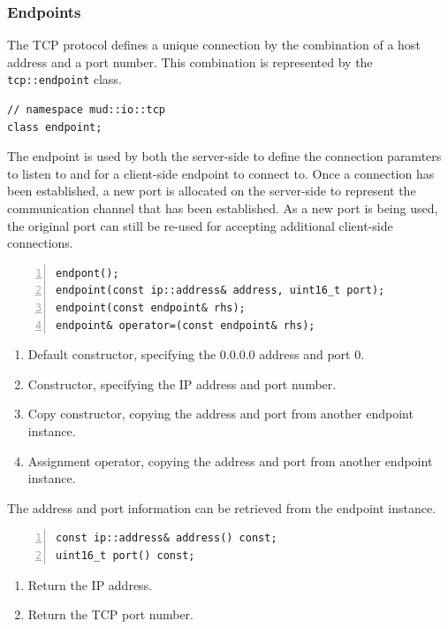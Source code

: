 \documentclass[10pt,a4paper,openany]{mudbook}
\makeatletter
\newcommand{\indextt}[2][]{\texttt{#2}\index{#2@\texttt{#2}#1}}
\newenvironment{enumeratedef}
  {\begin{enumerate}[topsep=0.5em,itemsep=0em,parsep=0em,font=\small]
     \small}
  {\end{enumerate}}
\makeatother
\begin{document}
\subsubsection{Endpoints}

The TCP protocol defines a unique connection by the combination of a host
address and a port number. This combination is represented by the
\indextt{tcp::endpoint} class.

\begin{lstlisting}[style=definition]
// namespace mud::io::tcp
class endpoint;
\end{lstlisting}

The endpoint is used by both the server-side to define the connection paramters
to listen to and for a client-side endpoint to connect to. Once a connection
has been established, a new port is allocated on the server-side to represent
the communication channel that has been established. As a new port is being
used, the original port can still be re-used for accepting additional
client-side connections. 

\begin{lstlisting}[style=definition,numbers=left]
endpont();
endpoint(const ip::address& address, uint16_t port);
endpoint(const endpoint& rhs);
endpoint& operator=(const endpoint& rhs);
\end{lstlisting}
\begin{enumeratedef}
  \item Default constructor, specifying the 0.0.0.0 address and port 0.
  \item Constructor, specifying the IP address and port number.
  \item Copy constructor, copying the address and port from another endpoint
        instance.
  \item Assignment operator, copying the address and port from another endpoint
        instance.
\end{enumeratedef}

The address and port information can be retrieved from the endpoint instance.

\begin{lstlisting}[style=definition,numbers=left]
const ip::address& address() const;
uint16_t port() const;
\end{lstlisting}
\begin{enumeratedef}
  \item Return the IP address.
  \item Return the TCP port number.
\end{enumeratedef}
\end{document}

